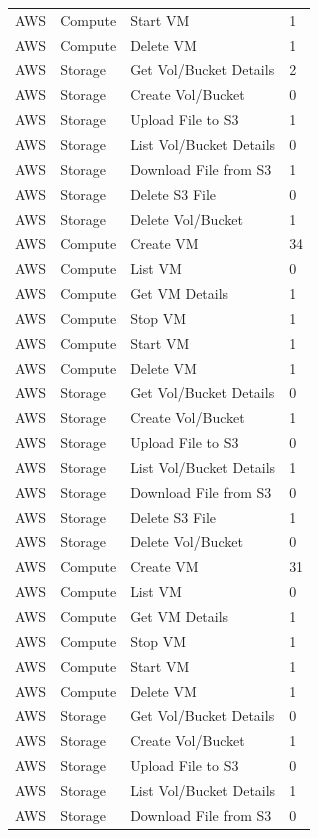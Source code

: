 \begin{table}[htb]
\begin{tabular} {p{3cm}|p{3cm}|p{5cm}|p{3cm}}
AWS & Compute & Start VM & 1  \\
AWS & Compute & Delete VM & 1  \\
AWS & Storage & Get Vol/Bucket Details & 2  \\
AWS & Storage & Create Vol/Bucket & 0  \\
AWS & Storage & Upload File to S3 & 1  \\
AWS & Storage & List Vol/Bucket Details & 0  \\
AWS & Storage & Download File from S3 & 1  \\
AWS & Storage & Delete S3 File & 0  \\
AWS & Storage & Delete Vol/Bucket & 1  \\
AWS & Compute & Create VM & 34  \\
AWS & Compute & List VM & 0  \\
AWS & Compute & Get VM Details & 1  \\
AWS & Compute & Stop VM & 1  \\
AWS & Compute & Start VM & 1  \\
AWS & Compute & Delete VM & 1  \\
AWS & Storage & Get Vol/Bucket Details & 0  \\
AWS & Storage & Create Vol/Bucket & 1  \\
AWS & Storage & Upload File to S3 & 0  \\
AWS & Storage & List Vol/Bucket Details & 1  \\
AWS & Storage & Download File from S3 & 0  \\
AWS & Storage & Delete S3 File & 1  \\
AWS & Storage & Delete Vol/Bucket & 0  \\
AWS & Compute & Create VM & 31  \\
AWS & Compute & List VM & 0  \\
AWS & Compute & Get VM Details & 1  \\
AWS & Compute & Stop VM & 1  \\
AWS & Compute & Start VM & 1  \\
AWS & Compute & Delete VM & 1  \\
AWS & Storage & Get Vol/Bucket Details & 0  \\
AWS & Storage & Create Vol/Bucket & 1  \\
AWS & Storage & Upload File to S3 & 0  \\
AWS & Storage & List Vol/Bucket Details & 1  \\
AWS & Storage & Download File from S3 & 0  \\

\end{tabular}
\end{table}
